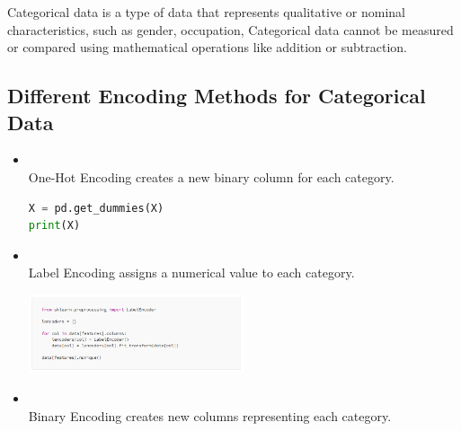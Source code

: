 \documentclass{article}
\begin{document}
Categorical data is a type of data that represents qualitative or nominal characteristics, such as gender, occupation, Categorical data cannot be measured or compared using mathematical operations like addition or subtraction.
\subsection{Different Encoding Methods for Categorical Data}
\begin{itemize}
    \item \textbf{\textcolor{blue}{}}\\
    One-Hot Encoding creates a new binary column for each category.
    \begin{lstlisting}[language=Python, caption={Logistic Regression Example}, label={lst:logreg}, backgroundcolor=\color{gray!10}, frame=single, keywordstyle=\color{blue}\bfseries, commentstyle=\color{green!50!black}, stringstyle=\color{orange}]
X = pd.get_dummies(X)
print(X)
    \end{lstlisting}
    \item \textbf{\textcolor{blue}{}}\\
    Label Encoding assigns a numerical value to each category.
    \begin{center}
        \includegraphics[width=0.5\textwidth]{label encoding} %
    \end{center}
    \item \textbf{\textcolor{blue}{}}\\
    Binary Encoding creates new columns representing each category.
\end{itemize}
\end{document}
